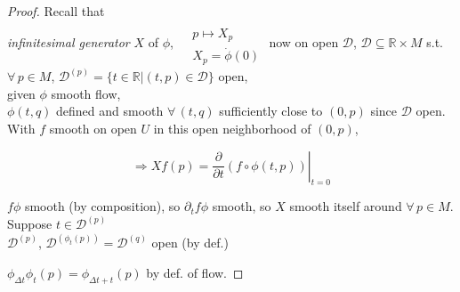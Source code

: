\begin{proof}
Recall that  \\
\emph{infinitesimal generator} $X$ of $\phi$, $\begin{aligned} & \quad \\ 
  & p \mapsto X_p \\
  & X_p = \dot{\phi}(0) \end{aligned}$ \quad now on open $\mathcal{D}$, $\mathcal{D} \subseteq \mathbb{R} \times M$ s.t. $\forall \, p \in M$, $\mathcal{D}^{(p)} = \lbrace t \in \mathbb{R} | (t,p) \in \mathcal{D} \rbrace$ open, \\

given $\phi$ smooth flow, \\
\quad $\phi(t,q)$ defined and smooth $\forall \, (t,q)$ sufficiently close to $(0,p)$ since $\mathcal{D}$ open.  With $f$ smooth on open $U$ in this open neighborhood of $(0,p)$, 

\[
\Longrightarrow Xf(p) = \left. \frac{ \partial }{ \partial t } (f \circ \phi(t,p)) \right|_{t=0}
\]

$f\phi$ smooth (by composition), so $\partial_t f\phi$ smooth, so $X$ smooth itself around $\forall \, p \in M$.   \\

Suppose $t\in \mathcal{D}^{(p)}$ \\
$\mathcal{D}^{(p)}$, $\mathcal{D}^{ (\phi_t(p))} = \mathcal{D}^{(q)}$ open (by def.)

$\phi_{\Delta t}\phi_t(p) = \phi_{ \Delta t + t }(p)$ by def. of flow. 









\end{proof}

